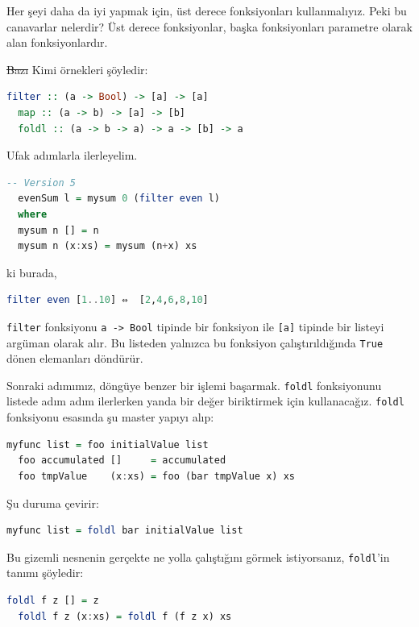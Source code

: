 \documentclass[a4paper,14pt,openany]{extbook} %
\begin{document}
Her şeyi daha da iyi yapmak için, üst derece fonksiyonları
kullanmalıyız. Peki bu canavarlar nelerdir? Üst derece fonksiyonlar,
başka fonksiyonları parametre olarak alan fonksiyonlardır.

\st{Bazı} Kimi örnekleri şöyledir:

\begin{lstlisting}[language=Haskell]
  filter :: (a -> Bool) -> [a] -> [a]
  map :: (a -> b) -> [a] -> [b]
  foldl :: (a -> b -> a) -> a -> [b] -> a
\end{lstlisting}

Ufak adımlarla ilerleyelim.

\begin{lstlisting}[language=Haskell]
  -- Version 5
  evenSum l = mysum 0 (filter even l)
  where
  mysum n [] = n
  mysum n (x:xs) = mysum (n+x) xs
\end{lstlisting}

ki burada,

\begin{lstlisting}[language=Haskell]
  filter even [1..10] ⇔  [2,4,6,8,10]
\end{lstlisting}

\lstinline!filter! fonksiyonu \lstinline!a -> Bool! tipinde bir
fonksiyon ile  \lstinline![a]! tipinde bir listeyi argüman olarak alır.
Bu listeden yalnızca bu fonksiyon çalıştırıldığında \lstinline!True! dönen
elemanları döndürür.

Sonraki adımımız, döngüye benzer bir işlemi başarmak. \lstinline!foldl!
fonksiyonunu listede adım adım ilerlerken yanda bir değer biriktirmek
için kullanacağız. \lstinline!foldl! fonksiyonu esasında şu master yapıyı alıp:

\begin{lstlisting}[language=Haskell]
  myfunc list = foo initialValue list
  foo accumulated []     = accumulated
  foo tmpValue    (x:xs) = foo (bar tmpValue x) xs
\end{lstlisting}

Şu duruma çevirir:

\begin{lstlisting}[language=Haskell]
  myfunc list = foldl bar initialValue list
\end{lstlisting}

Bu gizemli nesnenin gerçekte ne yolla çalıştığını görmek istiyorsanız,
\lstinline!foldl!'in tanımı şöyledir:

\begin{lstlisting}[language=Haskell]
  foldl f z [] = z
  foldl f z (x:xs) = foldl f (f z x) xs
\end{lstlisting}
\end{document}
